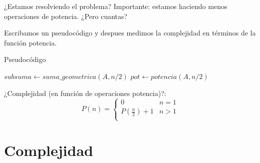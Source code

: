 \documentclass[pdf]{beamer}
\begin{document}
\begin{frame}{¿Estamos resolviendo el problema?}
    Importante: estamos haciendo menos operaciones de potencia. ¿Pero cuantas?
    
    \pause
    \vspace{2em}
    Escribamos un pseudocódigo y despues medimos la complejidad en términos de la función potencia.
    
\end{frame}

\begin{frame}{Pseudocódigo}
    
\begin{algorithmic}

	\State {} 
    \EndIf

    \vspace{0.5em}
    \State $subsuma \gets suma\_geometrica(A, n/2)$ 
    \vspace{0.5em}
    \State $pot \gets potencia(A, n/2)$ 
    \vspace{0.5em}
    
    \State {} 
    \vspace{0.5em}
    
\EndFunction

\pause

¿Complejidad (en función de operaciones potencia)?: 
\pause
 \[ P(n) =  \begin{cases} 
    0 & n = 1 \\
    P(\frac{n}{2}) + 1 & n > 1 \\ 
   \end{cases}
 \]


\end{algorithmic}

\end{frame}

\section{Complejidad}
\end{document}
